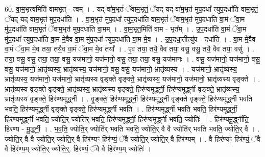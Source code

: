 \documentclass[17pt]{extarticle}
\begin{document}
60. वा॒म॒भृ॒त्त्वमिति॑ वामभृत् - त्वम् । . यद् वा॑म॒भृतं॑ ॅवाम॒भृतं॒ ॅयद् यद् वा॑म॒भृत॑ मुप॒दधा᳚ त्युप॒दधा॑ति वाम॒भृतं॒ ॅयद् यद् वा॑म॒भृत॑ मुप॒दधा॑ति । . वा॒म॒भृत॑ मुप॒दधा᳚ त्युप॒दधा॑ति वाम॒भृतं॑ ॅवाम॒भृत॑ मुप॒दधा॑ति वा॒मं ॅवा॒म मु॑प॒दधा॑ति वाम॒भृतं॑ ॅवाम॒भृत॑ मुप॒दधा॑ति वा॒मम् । . वा॒म॒भृत॒मिति॑ वाम - भृत᳚म् । . उ॒प॒दधा॑ति वा॒मं ॅवा॒म मु॑प॒दधा᳚ त्युप॒दधा॑ति वा॒म मे॒वैव वा॒म मु॑प॒दधा᳚ त्युप॒दधा॑ति वा॒म मे॒व । . उ॒प॒दधा॒तीत्यु॑प - दधा॑ति । . वा॒म मे॒वैव वा॒मं ॅवा॒म मे॒व तया॒ तयै॒व वा॒मं ॅवा॒म मे॒व तया᳚ । . ए॒व तया॒ तयै॒ वैव तया॒ वसु॒ वसु॒ तयै॒ वैव तया॒ वसु॑ । . तया॒ वसु॒ वसु॒ तया॒ तया॒ वसु॒ यज॑मानो॒ यज॑मानो॒ वसु॒ तया॒ तया॒ वसु॒ यज॑मानः । . वसु॒ यज॑मानो॒ यज॑मानो॒ वसु॒ वसु॒ यज॑मानो॒ भ्रातृ॑व्यस्य॒ भ्रातृ॑व्यस्य॒ यज॑मानो॒ वसु॒ वसु॒ यज॑मानो॒ भ्रातृ॑व्यस्य । . यज॑मानो॒ भ्रातृ॑व्यस्य॒ भ्रातृ॑व्यस्य॒ यज॑मानो॒ यज॑मानो॒ भ्रातृ॑व्यस्य वृङ्क्ते वृङ्क्ते॒ भ्रातृ॑व्यस्य॒ यज॑मानो॒ यज॑मानो॒ भ्रातृ॑व्यस्य वृङ्क्ते । . भ्रातृ॑व्यस्य वृङ्क्ते वृङ्क्ते॒ भ्रातृ॑व्यस्य॒ भ्रातृ॑व्यस्य वृङ्क्ते॒ हिर॑ण्यमूर्द्ध्नी॒ हिर॑ण्यमूर्द्ध्नी वृङ्क्ते॒ भ्रातृ॑व्यस्य॒ भ्रातृ॑व्यस्य वृङ्क्ते॒ हिर॑ण्यमूर्द्ध्नी । . वृ॒ङ्क्ते॒ हिर॑ण्यमूर्द्ध्नी॒ हिर॑ण्यमूर्द्ध्नी वृङ्क्ते वृङ्क्ते॒ हिर॑ण्यमूर्द्ध्नी भवति भवति॒ हिर॑ण्यमूर्द्ध्नी वृङ्क्ते वृङ्क्ते॒ हिर॑ण्यमूर्द्ध्नी भवति । . हिर॑ण्यमूर्द्ध्नी भवति भवति॒ हिर॑ण्यमूर्द्ध्नी॒ हिर॑ण्यमूर्द्ध्नी भवति॒ ज्योति॒र् ज्योति॑र् भवति॒ हिर॑ण्यमूर्द्ध्नी॒ हिर॑ण्यमूर्द्ध्नी भवति॒ ज्योतिः॑ । . हिर॑ण्यमू॒र्द्ध्नीति॒ हिर॑ण्य - मू॒र्द्ध्नी॒ । . भ॒व॒ति॒ ज्योति॒र् ज्योति॑र् भवति भवति॒ ज्योति॒र् वै वै ज्योति॑र् भवति भवति॒ ज्योति॒र् वै । . ज्योति॒र् वै वै ज्योति॒र् ज्योति॒र् वै हिर॑ण्यꣳ॒॒ हिर॑ण्यं॒ ॅवै ज्योति॒र् ज्योति॒र् वै हिर॑ण्यम् । . वै हिर॑ण्यꣳ॒॒ हिर॑ण्यं॒ ॅवै वै हिर॑ण्य॒म् ज्योति॒र् ज्योति॒र्॒. हिर॑ण्यं॒ ॅवै वै हिर॑ण्य॒म् ज्योतिः॑ । \newline
\end{document}
